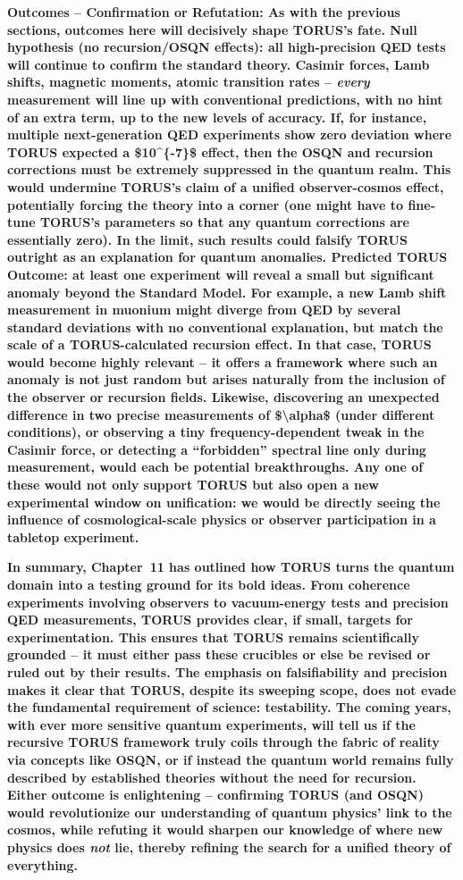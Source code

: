 \documentclass[
]{article}
\begin{document}
\textbf{Outcomes -- Confirmation or Refutation: As with the previous
sections, outcomes here will decisively shape TORUS's fate. Null
hypothesis (no recursion/OSQN effects): all high-precision QED tests
will continue to confirm the standard theory. Casimir forces, Lamb
shifts, magnetic moments, atomic transition rates -- \emph{every}
measurement will line up with conventional predictions, with no hint of
an extra term, up to the new levels of accuracy. If, for instance,
multiple next-generation QED experiments show zero deviation where TORUS
expected a \$10\^{}\{-7\}\$ effect, then the OSQN and recursion
corrections must be extremely suppressed in the quantum realm. This
would undermine TORUS's claim of a unified observer-cosmos effect,
potentially forcing the theory into a corner (one might have to
fine-tune TORUS's parameters so that any quantum corrections are
essentially zero). In the limit, such results could falsify TORUS
outright as an explanation for quantum anomalies. Predicted TORUS
Outcome: at least one experiment will reveal a small but significant
anomaly beyond the Standard Model. For example, a new Lamb shift
measurement in muonium might diverge from QED by several standard
deviations with no conventional explanation, but match the scale of a
TORUS-calculated recursion effect. In that case, TORUS would become
highly relevant -- it offers a framework where such an anomaly is not
just random but arises naturally from the inclusion of the observer or
recursion fields. Likewise, discovering an unexpected difference in two
precise measurements of \$\textbackslash alpha\$ (under different
conditions), or observing a tiny frequency-dependent tweak in the
Casimir force, or detecting a ``forbidden'' spectral line only during
measurement, would each be potential breakthroughs. Any one of these
would not only support TORUS but also open a new experimental window on
unification: we would be directly seeing the influence of
cosmological-scale physics or observer participation in a tabletop
experiment.}

\textbf{In summary, Chapter~11 has outlined how TORUS turns the quantum
domain into a testing ground for its bold ideas. From coherence
experiments involving observers to vacuum-energy tests and precision QED
measurements, TORUS provides clear, if small, targets for
experimentation. This ensures that TORUS remains scientifically grounded
-- it must either pass these crucibles or else be revised or ruled out
by their results. The emphasis on falsifiability and precision makes it
clear that TORUS, despite its sweeping scope, does not evade the
fundamental requirement of science: testability. The coming years, with
ever more sensitive quantum experiments, will tell us if the recursive
TORUS framework truly coils through the fabric of reality via concepts
like OSQN, or if instead the quantum world remains fully described by
established theories without the need for recursion. Either outcome is
enlightening -- confirming TORUS (and OSQN) would revolutionize our
understanding of quantum physics' link to the cosmos, while refuting it
would sharpen our knowledge of where new physics does \emph{not} lie,
thereby refining the search for a unified theory of everything.}
\end{document}
